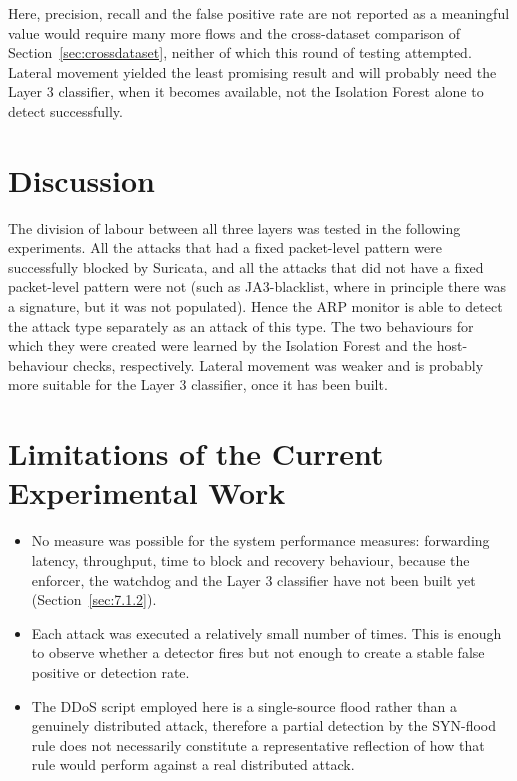 \noindent Here, precision, recall and the false positive rate are not reported as a meaningful value would require many more flows and the cross-dataset comparison of Section~\ref{sec:crossdataset}, neither of which this round of testing attempted. Lateral movement yielded the least promising result and will probably need the Layer 3 classifier, when it becomes available, not the Isolation Forest alone to detect successfully.

\section{Discussion}\label{sec:9.4}

\noindent The division of labour between all three layers was tested in the following experiments. All the attacks that had a fixed packet-level pattern were successfully blocked by Suricata, and all the attacks that did not have a fixed packet-level pattern were not (such as JA3-blacklist, where in principle there was a signature, but it was not populated). Hence the ARP monitor is able to detect the attack type separately as an attack of this type. The two behaviours for which they were created were learned by the Isolation Forest and the host-behaviour checks, respectively. Lateral movement was weaker and is probably more suitable for the Layer 3 classifier, once it has been built.


\section{Limitations of the Current Experimental Work}\label{sec:9.5}

\begin{itemize}
    \item No measure was possible for the system performance measures: forwarding latency, throughput, time to block and recovery behaviour, because the enforcer, the watchdog and the Layer 3 classifier have not been built yet (Section~\ref{sec:7.1.2}).
    \item Each attack was executed a relatively small number of times. This is enough to observe whether a detector fires but not enough to create a stable false positive or detection rate.
    \item The DDoS script employed here is a single-source flood rather than a genuinely distributed attack, therefore a partial detection by the SYN-flood rule does not necessarily constitute a representative reflection of how that rule would perform against a real distributed attack.
\end{itemize}

